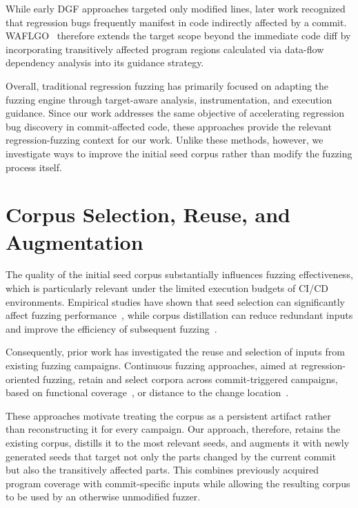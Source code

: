 While early \ac{DGF} approaches targeted only modified lines, later work
recognized that regression bugs frequently manifest in code indirectly affected
by a commit. WAFLGO~\cite{xiangCriticalCodeGuided2024} therefore extends the
target scope beyond the immediate code diff by incorporating transitively
affected program regions calculated via data-flow dependency analysis into its
guidance strategy. 

Overall, traditional regression fuzzing has primarily focused on adapting the
fuzzing engine through target-aware analysis, instrumentation, and execution
guidance. Since our work addresses the same objective of accelerating regression
bug discovery in commit-affected code, these approaches provide the relevant
regression-fuzzing context for our work. Unlike these methods, however, we
investigate ways to improve the initial seed corpus rather than modify the
fuzzing process itself.

\section{Corpus Selection, Reuse, and Augmentation}
\label{sec:rw-corpus}

The quality of the initial seed corpus substantially influences fuzzing
effectiveness, which is particularly relevant under the limited execution
budgets of CI/CD environments. Empirical studies have shown that seed selection
can significantly affect fuzzing
performance~\cite{herreraSeedSelectionSuccessful2021}, while corpus distillation
can reduce redundant inputs and improve the efficiency of subsequent
fuzzing~\cite{herreraCorpusDistillationEffective2020}.

Consequently, prior work has investigated the reuse and selection of inputs from existing fuzzing campaigns.
Continuous fuzzing approaches, aimed at regression-oriented fuzzing, retain and select corpora across commit-triggered campaigns, based on functional coverage~\cite{yooImprovingConfigurabilityUnitlevel2021,kimBugOssBenchmarkRealworld2024}, or distance to the change location~\cite{canakciTargetFuzzUsingDARTs2022}.

These approaches motivate treating the corpus as a persistent artifact rather than reconstructing it for every campaign.
Our approach, therefore, retains the existing corpus, distills it to the most relevant seeds, and augments it with newly generated seeds that target not only the parts changed by the current commit but also the transitively affected parts.
This combines previously acquired program coverage with commit-specific inputs while allowing the resulting corpus to be used by an otherwise unmodified fuzzer.

